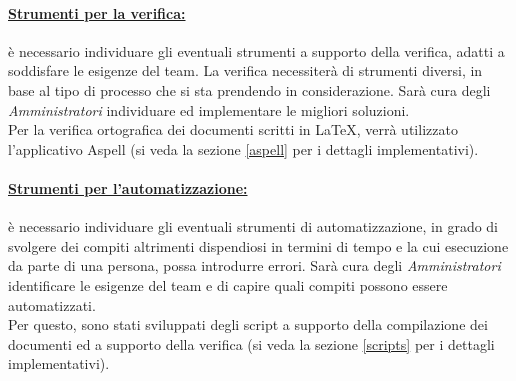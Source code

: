 \paragraph{\underline{Strumenti per la verifica:}} è necessario individuare gli eventuali strumenti a supporto della verifica, adatti a soddisfare le esigenze del team. La verifica necessiterà di strumenti diversi, in base al tipo di processo che si sta prendendo in considerazione. Sarà cura degli \textit{Amministratori} individuare ed implementare le migliori soluzioni.\\
Per la verifica ortografica dei documenti scritti in \LaTeX{}, verrà utilizzato l'applicativo Aspell\g{} (si veda la sezione \ref{aspell} per i dettagli implementativi).

\paragraph{\underline{Strumenti per l'automatizzazione:}} è necessario individuare gli eventuali strumenti di automatizzazione, in grado di svolgere dei compiti altrimenti dispendiosi in termini di tempo e la cui esecuzione da parte di una persona, possa introdurre errori. Sarà cura degli \textit{Amministratori} identificare le esigenze del team e di capire quali compiti possono essere automatizzati.\\
Per questo, sono stati sviluppati degli script a supporto della compilazione dei documenti ed a supporto della verifica (si veda la sezione \ref{scripts} per i dettagli implementativi).